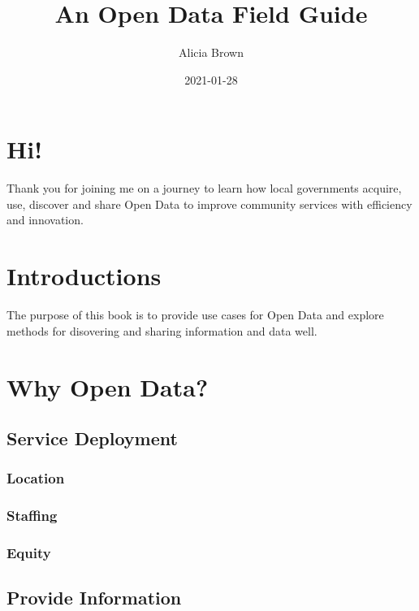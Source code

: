 \documentclass[
]{book}
\title{An Open Data Field Guide}
\author{Alicia Brown}
\date{2021-01-28}
\begin{document}
\maketitle

{
\setcounter{tocdepth}{1}
\tableofcontents
}
\hypertarget{hi}{%
\chapter{Hi!}\label{hi}}

Thank you for joining me on a journey to learn how local governments acquire, use, discover and share Open Data to improve community services with efficiency and innovation.

\hypertarget{intro}{%
\chapter{Introductions}\label{intro}}

The purpose of this book is to provide use cases for Open Data and explore methods for disovering and sharing information and data well.

\hypertarget{why-open-data}{%
\chapter{Why Open Data?}\label{why-open-data}}

\hypertarget{service-deployment}{%
\section{Service Deployment}\label{service-deployment}}

\hypertarget{location}{%
\subsection{Location}\label{location}}

\hypertarget{staffing}{%
\subsection{Staffing}\label{staffing}}

\hypertarget{equity}{%
\subsection{Equity}\label{equity}}

\hypertarget{provide-information}{%
\section{Provide Information}\label{provide-information}}
\end{document}
